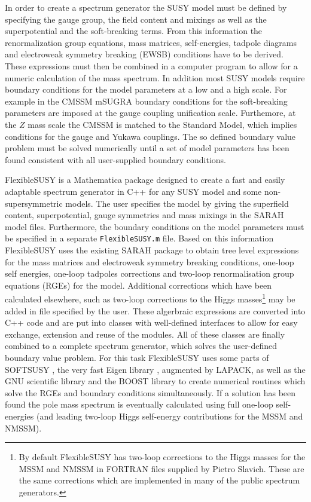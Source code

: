\documentclass[final,3p,11pt,pdflatex]{elsarticle}
\makeatletter
\newcommand{\sarah}{SARAH\@\xspace}
\newcommand{\fs}{FlexibleSUSY\@\xspace}
\newcommand{\mathematica}{Mathematica\xspace}
\newcommand{\code}[1]{\lstinline|#1|}  %
\makeatother
\begin{document}
In order to create a spectrum generator the SUSY model must be defined
by specifying the gauge group, the field content and mixings as well
as the superpotential and the soft-breaking terms.  From this
information the renormalization group equations, mass matrices,
self-energies, tadpole diagrams and electroweak symmetry breaking
(EWSB) conditions have to be derived.  These expressions must then be
combined in a computer program to allow for a numeric calculation of
the mass spectrum.  In addition most SUSY models require boundary
conditions for the model parameters at a low and a high scale.  For
example in the CMSSM mSUGRA boundary conditions for the soft-breaking
parameters are imposed at the gauge coupling unification scale.
Furthemore, at the $Z$ mass scale the CMSSM is matched to the Standard
Model, which implies conditions for the gauge and Yukawa couplings.
The so defined boundary value problem must be solved numerically until
a set of model parameters has been found consistent with all
user-supplied boundary conditions.

\fs is a \mathematica package designed to create a fast and easily
adaptable spectrum generator in C++ for any SUSY model and some
non-supersymmetric models.  The user specifies the model by giving the
superfield content, superpotential, gauge symmetries and mass mixings
in the \sarah model files.  Furthermore, the boundary conditions on
the model parameters must be specified in a separate
\code{FlexibleSUSY.m} file.
%
Based on this information \fs uses the existing \sarah package
\cite{Staub:2010ty,Staub:2009bi,Staub:2010jh,Staub:2012pb,Staub:2013tta}
to obtain tree level expressions for the mass matrices and electroweak
symmetry breaking conditions, one-loop self energies, one-loop
tadpoles corrections and two-loop renormalisation group equations
(RGEs) for the model.  Additional corrections which have been
calculated elsewhere, such as two-loop corrections to the Higgs
masses\footnote{By default FlexibleSUSY has two-loop corrections to
  the Higgs masses for the MSSM
  \cite{Degrassi:2001yf,Brignole:2001jy,Dedes:2002dy,Brignole:2002bz,Dedes:2003km}
  and NMSSM \cite{Degrassi:2009yq} in FORTRAN files supplied by Pietro
  Slavich. These are the same corrections which are implemented in
  many of the public spectrum generators.} may be added in file
specified by the user.
%
These algerbraic expressions are converted into C++ code and are put
into classes with well-defined interfaces to allow for easy exchange,
extension and reuse of the modules.  All of these classes are finally
combined to a complete spectrum generator, which solves the
user-defined boundary value problem.  For this task \fs uses some
parts of SOFTSUSY \cite{Allanach:2001kg}, the very fast Eigen library
\cite{eigen}, augmented by LAPACK, as well as the GNU scientific
library and the BOOST library to create numerical routines which solve
the RGEs and boundary conditions simultaneously.  If a solution has
been found the pole mass spectrum is eventually calculated using full
one-loop self-energies (and leading two-loop Higgs self-energy
contributions for the MSSM and NMSSM).
\end{document}
